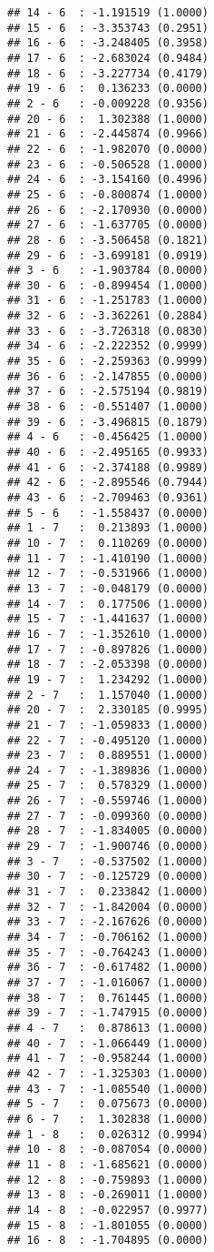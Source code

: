 \documentclass[12pt,]{article}
\begin{document}
\begin{verbatim}
## 14 - 6  : -1.191519 (1.0000)
## 15 - 6  : -3.353743 (0.2951)
## 16 - 6  : -3.248405 (0.3958)
## 17 - 6  : -2.683024 (0.9484)
## 18 - 6  : -3.227734 (0.4179)
## 19 - 6  :  0.136233 (0.0000)
## 2 - 6   : -0.009228 (0.9356)
## 20 - 6  :  1.302388 (1.0000)
## 21 - 6  : -2.445874 (0.9966)
## 22 - 6  : -1.982070 (0.0000)
## 23 - 6  : -0.506528 (1.0000)
## 24 - 6  : -3.154160 (0.4996)
## 25 - 6  : -0.800874 (1.0000)
## 26 - 6  : -2.170930 (0.0000)
## 27 - 6  : -1.637705 (0.0000)
## 28 - 6  : -3.506458 (0.1821)
## 29 - 6  : -3.699181 (0.0919)
## 3 - 6   : -1.903784 (0.0000)
## 30 - 6  : -0.899454 (1.0000)
## 31 - 6  : -1.251783 (1.0000)
## 32 - 6  : -3.362261 (0.2884)
## 33 - 6  : -3.726318 (0.0830)
## 34 - 6  : -2.222352 (0.9999)
## 35 - 6  : -2.259363 (0.9999)
## 36 - 6  : -2.147855 (0.0000)
## 37 - 6  : -2.575194 (0.9819)
## 38 - 6  : -0.551407 (1.0000)
## 39 - 6  : -3.496815 (0.1879)
## 4 - 6   : -0.456425 (1.0000)
## 40 - 6  : -2.495165 (0.9933)
## 41 - 6  : -2.374188 (0.9989)
## 42 - 6  : -2.895546 (0.7944)
## 43 - 6  : -2.709463 (0.9361)
## 5 - 6   : -1.558437 (0.0000)
## 1 - 7   :  0.213893 (1.0000)
## 10 - 7  :  0.110269 (0.0000)
## 11 - 7  : -1.410190 (1.0000)
## 12 - 7  : -0.531966 (1.0000)
## 13 - 7  : -0.048179 (0.0000)
## 14 - 7  :  0.177506 (1.0000)
## 15 - 7  : -1.441637 (1.0000)
## 16 - 7  : -1.352610 (1.0000)
## 17 - 7  : -0.897826 (1.0000)
## 18 - 7  : -2.053398 (0.0000)
## 19 - 7  :  1.234292 (1.0000)
## 2 - 7   :  1.157040 (1.0000)
## 20 - 7  :  2.330185 (0.9995)
## 21 - 7  : -1.059833 (1.0000)
## 22 - 7  : -0.495120 (1.0000)
## 23 - 7  :  0.889551 (1.0000)
## 24 - 7  : -1.389836 (1.0000)
## 25 - 7  :  0.578329 (1.0000)
## 26 - 7  : -0.559746 (1.0000)
## 27 - 7  : -0.099360 (0.0000)
## 28 - 7  : -1.834005 (0.0000)
## 29 - 7  : -1.900746 (0.0000)
## 3 - 7   : -0.537502 (1.0000)
## 30 - 7  : -0.125729 (0.0000)
## 31 - 7  :  0.233842 (1.0000)
## 32 - 7  : -1.842004 (0.0000)
## 33 - 7  : -2.167626 (0.0000)
## 34 - 7  : -0.706162 (1.0000)
## 35 - 7  : -0.764243 (1.0000)
## 36 - 7  : -0.617482 (1.0000)
## 37 - 7  : -1.016067 (1.0000)
## 38 - 7  :  0.761445 (1.0000)
## 39 - 7  : -1.747915 (0.0000)
## 4 - 7   :  0.878613 (1.0000)
## 40 - 7  : -1.066449 (1.0000)
## 41 - 7  : -0.958244 (1.0000)
## 42 - 7  : -1.325303 (1.0000)
## 43 - 7  : -1.085540 (1.0000)
## 5 - 7   :  0.075673 (0.0000)
## 6 - 7   :  1.302838 (1.0000)
## 1 - 8   :  0.026312 (0.9994)
## 10 - 8  : -0.087054 (0.0000)
## 11 - 8  : -1.685621 (0.0000)
## 12 - 8  : -0.759893 (1.0000)
## 13 - 8  : -0.269011 (1.0000)
## 14 - 8  : -0.022957 (0.9977)
## 15 - 8  : -1.801055 (0.0000)
## 16 - 8  : -1.704895 (0.0000)

\end{verbatim}
\end{document}
